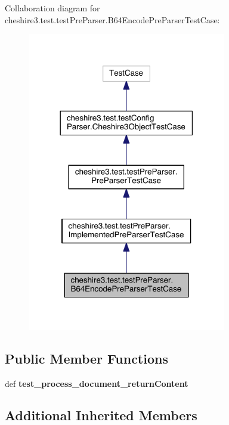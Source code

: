 Collaboration diagram for cheshire3.\-test.\-test\-Pre\-Parser.\-B64\-Encode\-Pre\-Parser\-Test\-Case\-:
\nopagebreak
\begin{figure}[H]
\begin{center}
\leavevmode
\includegraphics[width=246pt]{classcheshire3_1_1test_1_1test_pre_parser_1_1_b64_encode_pre_parser_test_case__coll__graph}
\end{center}
\end{figure}
\subsection*{Public Member Functions}
\begin{DoxyCompactItemize}
\item 
\hypertarget{classcheshire3_1_1test_1_1test_pre_parser_1_1_b64_encode_pre_parser_test_case_acd9ca422e3c5145d13ecbe782b30ec18}{def {\bfseries test\-\_\-process\-\_\-document\-\_\-return\-Content}}\label{classcheshire3_1_1test_1_1test_pre_parser_1_1_b64_encode_pre_parser_test_case_acd9ca422e3c5145d13ecbe782b30ec18}

\end{DoxyCompactItemize}
\subsection*{Additional Inherited Members}


